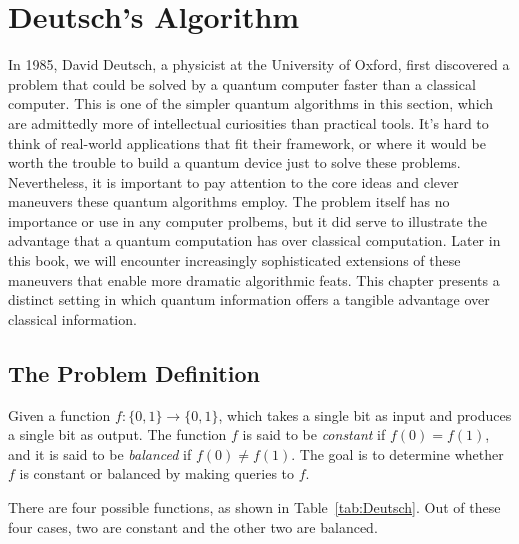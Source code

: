 \chapter{Deutsch's Algorithm}

 In 1985, David Deutsch, a physicist at the University of Oxford, first discovered a problem that could be solved by a quantum computer faster than a classical computer. This is one of the simpler quantum algorithms in this section, which are admittedly more of intellectual curiosities than practical tools. It's hard to think of real-world applications that fit their framework, or where it would be worth the trouble to build a quantum device just to solve these problems. Nevertheless, it is important to pay attention to the core ideas and clever maneuvers these quantum algorithms employ. The problem itself has no importance or use in any computer prolbems, but it did serve to illustrate the advantage that a quantum computation has over classical computation. Later in this book, we will encounter increasingly sophisticated extensions of these maneuvers that enable more dramatic algorithmic feats. This chapter presents a distinct setting in which quantum information offers a tangible advantage over classical information.

\section{The Problem Definition}

\begin{definition}
    Given a function $f:\{0,1\} \rightarrow \{0,1\}$, which takes a single bit as input and 
    produces a single bit as output. The function $f$ is said to be \textit{constant} if $f(0) = f(1)$, and it is said to be \textit{balanced} if $f(0) \neq f(1)$. The goal is to determine whether $f$ is constant or balanced by making queries to $f$.
\end{definition}

There are four possible functions, as shown in Table~\ref{tab:Deutsch}. Out of these four cases, two are constant and the other two are balanced.

